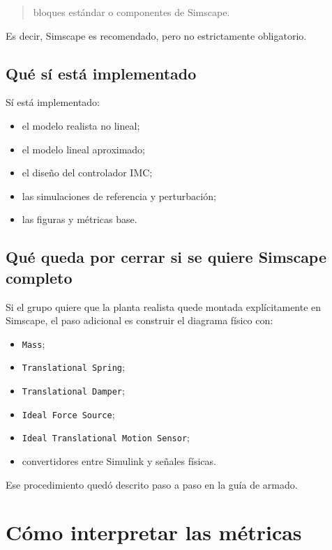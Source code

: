 \documentclass[11pt]{article}
\begin{document}
\begin{quote}
bloques est\'andar o componentes de Simscape.
\end{quote}

Es decir, Simscape es recomendado, pero no estrictamente obligatorio.

\subsection{Qu\'e s\'i est\'a implementado}

S\'i est\'a implementado:

\begin{itemize}[leftmargin=1.2cm]
\item el modelo realista no lineal;
\item el modelo lineal aproximado;
\item el dise\~no del controlador IMC;
\item las simulaciones de referencia y perturbaci\'on;
\item las figuras y m\'etricas base.
\end{itemize}

\subsection{Qu\'e queda por cerrar si se quiere Simscape completo}

Si el grupo quiere que la planta realista quede montada expl\'icitamente en Simscape, el paso adicional es construir el diagrama f\'isico con:

\begin{itemize}[leftmargin=1.2cm]
\item \texttt{Mass};
\item \texttt{Translational Spring};
\item \texttt{Translational Damper};
\item \texttt{Ideal Force Source};
\item \texttt{Ideal Translational Motion Sensor};
\item convertidores entre Simulink y se\~nales f\'isicas.
\end{itemize}

Ese procedimiento qued\'o descrito paso a paso en la gu\'ia de armado.

\section{C\'omo interpretar las m\'etricas}
\end{document}
